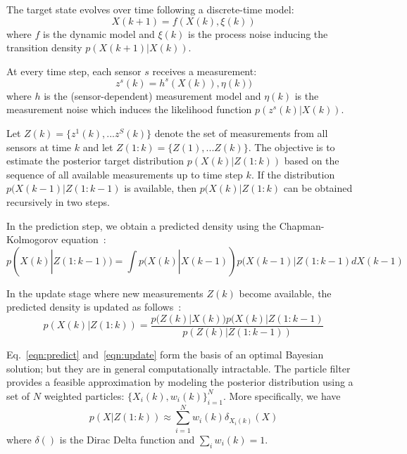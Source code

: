 \documentclass[10pt,letterpaper,final]{article}
\begin{document}
The target state evolves over time following a discrete-time model:
\begin{equation}
X(k+1) = f(X(k),\xi(k))
\label{eqn:dynamic_model}
\end{equation}
where $f$ is the dynamic model and $\xi(k)$ is the process noise inducing the transition density $p(X(k+1)|X(k))$. 

At every time step, each sensor $s$ receives a measurement:
\begin{equation}
z^s(k) = h^s(X(k)),\eta(k))
\end{equation}
where $h$ is the (sensor-dependent) measurement model and $\eta(k)$ is the measurement noise which induces the likelihood function $p(z^s(k)|X(k))$. %

Let $Z(k)=\{z^1(k),...z^S(k)\}$ denote the set of measurements from all sensors at time $k$ and let $Z(1:k)=\{Z(1),...Z(k)\}$. The objective is to estimate the posterior target distribution $p(X(k)|Z(1:k))$ based on the sequence of all available measurements up to time step $k$. If the distribution $p(X(k-1)|Z(1:k-1)$ is available, then $p(X(k)|Z(1:k)$ can be obtained recursively in two steps. 
 
In the prediction step, we obtain a predicted density using the Chapman-Kolmogorov equation~\cite{Ristic2003}:
\begin{equation}
p(X(k)|Z(1:k-1))= \int p(X(k)|X(k-1))p(X(k-1)|Z(1:k-1)dX(k-1)
\label{eqn:predict}
\end{equation}

In the update stage where new measurements $Z(k)$ become available, the predicted density is updated as follows~\cite{Ristic2003}:
\begin{equation}
p(X(k)|Z(1:k))=\frac{p(Z(k)|X(k))p(X(k)|Z(1:k-1)}{p(Z(k)|Z(1:k-1))}
\label{eqn:update}
\end{equation}

Eq.~\eqref{eqn:predict} and~\eqref{eqn:update} form the basis of an optimal Bayesian solution; but they are in general computationally intractable. The particle filter provides a feasible approximation by modeling the posterior distribution using a set of $N$ weighted particles: $\{ X_i(k), w_i(k) \}_{i=1}^N$. More specifically, we have
\begin{equation}
p(X|Z(1:k)) \approx \sum_{i=1}^N w_i(k)\delta_{X_i(k)}(X)
\end{equation}
where $\delta()$ is the Dirac Delta function and $\sum_i w_i(k) = 1$. 
\end{document}
